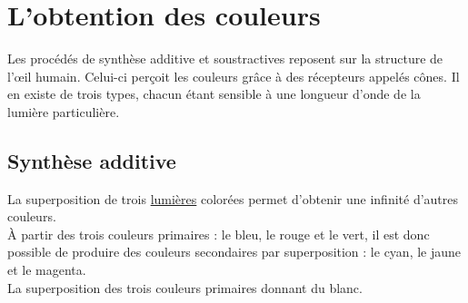 \documentclass[a4paper,11pt,fleqn]{article}%
\begin{document}
\maketitle
\section{L'obtention des couleurs}
Les procédés de synthèse additive et soustractives reposent sur la structure de l'\oe il humain. Celui-ci perçoit les couleurs grâce à des récepteurs appelés cônes. Il en existe de trois types, chacun étant sensible à une longueur d'onde de la lumière particulière.
    \subsection{Synthèse additive}
    \begin{minipage}{0.68\textwidth}
        La superposition de trois \underline{lumières} colorées permet d'obtenir une infinité d'autres couleurs.\\
        À partir des trois couleurs primaires : le bleu, le rouge et le vert, il est donc possible de produire des couleurs secondaires par superposition : le cyan, le jaune et le magenta.\\
        La superposition des trois couleurs primaires donnant du blanc.
    \end{minipage}
    \begin{minipage}
        {0.3\textwidth}
        \begin{center}
        \end{center}
    \end{minipage}
\end{document}
